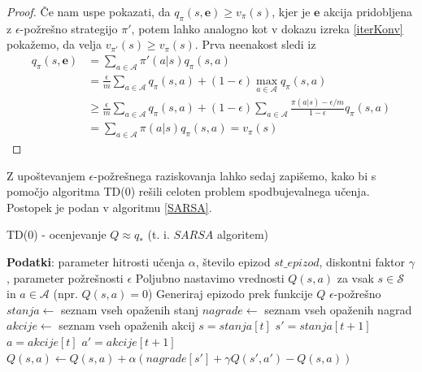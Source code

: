 \documentclass[12pt,a4paper]{amsart}
\theoremstyle{definition} %
\theoremstyle{plain} %
\begin{document}
\begin{proof}
    Če nam uspe pokazati, da $q_\pi(s, \textbf{e}) \geq v_\pi(s)$, kjer je $\textbf{e}$ akcija pridobljena 
    z $\epsilon$-požrešno strategijo $\pi'$, potem lahko analogno kot v dokazu izreka 
    \ref{iterKonv} pokažemo, da velja $v_{\pi'}(s) \geq v_\pi(s)$. Prva neenakost sledi iz
    \begin{align*}
        q_\pi(s, \textbf{e}) &= \sum_{a \in \mathcal{A}} \pi'(a|s) q_\pi(s, a) \\
        &= \frac{\epsilon}{m} \sum_{a \in \mathcal{A}} q_\pi(s, a) + (1 - \epsilon) \max_{a \in 
            \mathcal{A}} q_\pi(s, a) \\
        &\geq \frac{\epsilon}{m} \sum_{a \in \mathcal{A}} q_\pi(s, a) + (1 - \epsilon) \sum_{a \in \mathcal{A}} 
            \frac{\pi(a|s) - \epsilon / m}{1 - \epsilon} q_\pi(s, a) \\
        &= \sum_{a \in \mathcal{A}} \pi(a|s) q_\pi(s, a) = v_\pi(s)
    \end{align*}
\end{proof}

Z upoštevanjem $\epsilon$-požrešnega raziskovanja lahko sedaj zapišemo, kako bi s pomočjo algoritma 
TD($0$) rešili celoten problem spodbujevalnega učenja. Postopek je podan v algoritmu \ref{SARSA}.

\begin{algorithm}[H]
    \caption{TD($0$) - ocenjevanje  $Q \approx q_*$ (t. i. $SARSA$ algoritem)}
\begin{algorithmic}\label{SARSA}
    
    \STATE \textbf{Podatki}: parameter hitrosti učenja $\alpha$, število epizod $st\_epizod$, diskontni 
            faktor $\gamma$, parameter požrešnosti $\epsilon$
    \STATE 
    \STATE Poljubno nastavimo vrednosti $Q(s, a)$ za vsak $s \in \mathcal{S}$ in $a \in \mathcal{A}$ 
            (npr. $Q(s, a) = 0$)
    \STATE
        \STATE Generiraj epizodo prek funkcije $Q$ $\epsilon$-požrešno
        \STATE $stanja \leftarrow$ seznam vseh opaženih stanj
        \STATE $nagrade \leftarrow$ seznam vseh opaženih nagrad
        \STATE $akcije \leftarrow$ seznam vseh opaženih akcij
        \STATE
        \STATE $s = stanja[t]$
        \STATE $s' = stanja[t + 1]$
        \STATE $a = akcije[t]$
        \STATE $a' = akcije[t + 1]$
        \STATE $Q(s, a) \leftarrow Q(s, a) + \alpha (nagrade[s'] + \gamma Q(s', a') - Q(s, a))$ 
        \ENDFOR
    \ENDFOR

\end{algorithmic}
\end{algorithm}
\end{document}
